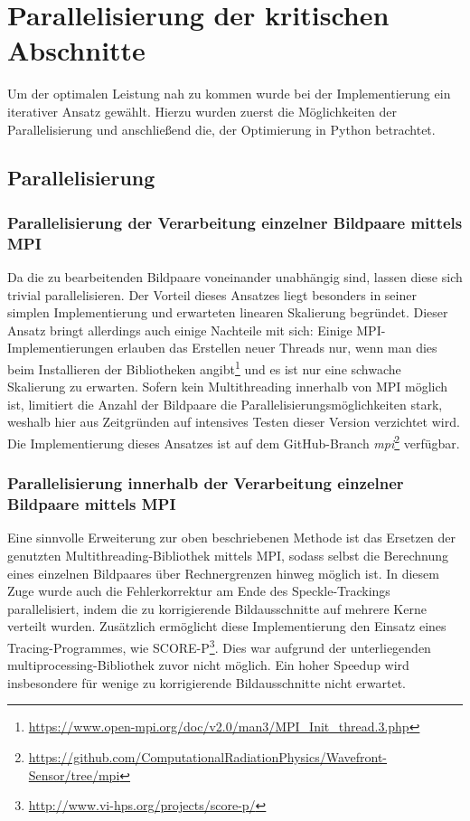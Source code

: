 \chapter{Parallelisierung der kritischen Abschnitte}

Um der optimalen Leistung nah zu kommen wurde bei der Implementierung ein iterativer Ansatz gewählt. Hierzu wurden zuerst die Möglichkeiten der Parallelisierung und anschließend die, der Optimierung in Python betrachtet. 

\section{Parallelisierung}

\subsection{Parallelisierung der Verarbeitung einzelner Bildpaare mittels MPI}

Da die zu bearbeitenden Bildpaare voneinander unabhängig sind, lassen diese sich trivial parallelisieren. Der Vorteil dieses Ansatzes liegt besonders in seiner simplen Implementierung und erwarteten linearen Skalierung begründet. Dieser Ansatz bringt allerdings auch einige Nachteile mit sich: Einige \gls{MPI}-Implementierungen erlauben das Erstellen neuer Threads nur, wenn man dies beim Installieren der Bibliotheken angibt\footnote{\url{https://www.open-mpi.org/doc/v2.0/man3/MPI_Init_thread.3.php}} und es ist nur eine schwache Skalierung zu erwarten. Sofern kein Multithreading innerhalb von \gls{MPI} möglich ist, limitiert die Anzahl der Bildpaare die Parallelisierungsmöglichkeiten stark, weshalb hier aus Zeitgründen auf intensives Testen dieser Version verzichtet wird. Die Implementierung dieses Ansatzes ist auf dem GitHub-Branch \textit{mpi}\footnote{\url{https://github.com/ComputationalRadiationPhysics/Wavefront-Sensor/tree/mpi}} verfügbar.

\subsection{Parallelisierung innerhalb der Verarbeitung einzelner Bildpaare mittels MPI}

Eine sinnvolle Erweiterung zur oben beschriebenen Methode ist das Ersetzen der genutzten Multithreading-Bibliothek mittels MPI, sodass selbst die Berechnung eines einzelnen Bildpaares über Rechnergrenzen hinweg möglich ist. In diesem Zuge wurde auch die Fehlerkorrektur am Ende des Speckle-Trackings parallelisiert, indem die zu korrigierende Bildausschnitte auf mehrere Kerne verteilt wurden. Zusätzlich ermöglicht diese Implementierung den Einsatz eines Tracing-Programmes, wie SCORE-P\footnote{\url{http://www.vi-hps.org/projects/score-p/}}. Dies war aufgrund der unterliegenden multiprocessing-Bibliothek zuvor nicht möglich. Ein hoher Speedup wird insbesondere für wenige zu korrigierende Bildausschnitte nicht erwartet. 

